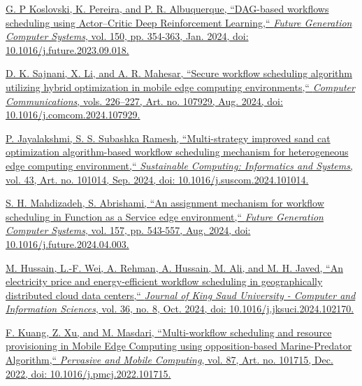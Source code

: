 \documentclass[a4paper, final]{article}
\begin{document}
\cleardoublepage
{}
\newpage
\begin{thebibliography}{0}
	\href{https://doi.org/10.1016/j.future.2023.09.018}{
    G. P Koslovski, K. Pereira, and P. R. Albuquerque, 
    ``DAG-based workflows scheduling using Actor–Critic Deep Reinforcement Learning,``
    \textit{Future Generation Computer Systems}, vol. 150, pp. 354-363, Jan. 2024, 
    doi: 10.1016/j.future.2023.09.018.
    }

	\href{https://doi.org/10.1016/j.comcom.2024.107929}{
    D. K. Sajnani, X. Li, and A. R. Mahesar,
    ``Secure workflow scheduling algorithm utilizing hybrid optimization in mobile edge computing environments,``
    \textit{Computer Communications}, vols. 226–227, Art. no. 107929, Aug. 2024,
    doi: 10.1016/j.comcom.2024.107929.
    }

    \href{https://doi.org/10.1016/j.suscom.2024.101014}{
    P. Jayalakshmi, S. S. Subashka Ramesh,
    ``Multi-strategy improved sand cat optimization algorithm-based workflow scheduling mechanism for
    heterogeneous edge computing environment,``
    \textit{Sustainable Computing: Informatics and Systems}, vol. 43, Art. no. 101014, Sep. 2024,
    doi: 10.1016/j.suscom.2024.101014.
    }

	\href{https://doi.org/10.1016/j.future.2024.04.003}{
    S. H. Mahdizadeh, S. Abrishami,
    ``An assignment mechanism for workflow scheduling in Function as a Service edge environment,``
    \textit{Future Generation Computer Systems}, vol. 157, pp. 543-557, Aug. 2024,
    doi: 10.1016/j.future.2024.04.003.
    }

	\href{https://doi.org/10.1016/j.jksuci.2024.102170}{
    M. Hussain, L.-F. Wei, A. Rehman, A. Hussain, M. Ali, and M. H. Javed,
    ``An electricity price and energy-efficient workflow scheduling in geographically distributed cloud data
    centers,``
    \textit{Journal of King Saud University - Computer and Information Sciences}, vol. 36, no. 8, Oct. 2024,
    doi: 10.1016/j.jksuci.2024.102170.
    }

	\href{https://doi.org/10.1016/j.pmcj.2022.101715}{
    F. Kuang, Z. Xu, and M. Masdari,
    ``Multi-workflow scheduling and resource provisioning in Mobile Edge Computing using opposition-based
    Marine-Predator Algorithm,``
    \textit{Pervasive and Mobile Computing}, vol. 87, Art. no. 101715, Dec. 2022,
    doi: 10.1016/j.pmcj.2022.101715.
    }


\end{thebibliography}
\end{document}
